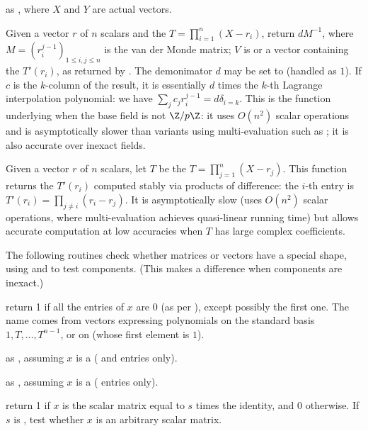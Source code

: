  as ,
where $X$ and $Y$ are actual  vectors.

 Given a vector $r$
of $n$ scalars and the  $T = \prod_{i=1}^n (X - r_i)$,
return $dM^{-1}$, where $M = (r_i^{j-1})_{1\leq i,j\leq n}$ is the van der
Monde matrix;  $V$ is  or a vector containing the $T'(r_i)$, as
returned by . The demonimator $d$ may be set to
 (handled as $1$). If $c$ is the $k$-column of the result, it is
essentially $d$ times  the $k$-th Lagrange interpolation polynomial: we have
$\sum_j c_j r_i^{j-1} = d \delta_{i=k}$. This is the function underlying
 when the base field is not $\Z/p\Z$: it uses $O(n^2)$
scalar operations and is asymptotically slower than variants using
multi-evaluation such as ; it is also accurate over inexact
fields.

 Given a vector $r$ of $n$ scalars, let
$T$ be the  $T = \prod_{j=1}^n (X - r_j)$. This function returns the
$T'(r_i)$ computed stably via products of difference: the $i$-th entry is
$T'(r_i) = \prod_{j\neq i} (r_i - r_j)$. It is asymptotically slow (uses
$O(n^2)$ scalar operations, where multi-evaluation achieves quasi-linear
running time) but allows accurate computation at low accuracies when $T$ has
large complex coefficients.


The following routines check whether matrices or vectors have a special
shape, using  and  to test components. (This makes
a difference when components are inexact.)

 return 1 if all the entries of $x$ are $0$
(as per ), except possibly the first one. The name comes from
vectors expressing polynomials on the standard basis $1,T,\dots, T^{n-1}$, or
on  (whose first element is $1$).

 as , assuming $x$ is a
 ( and  entries only).

 as , assuming $x$ is a
 ( entries only).

 return 1 if $x$ is the scalar matrix
equal to $s$ times the identity, and 0 otherwise. If $s$ is , test
whether $x$ is an arbitrary scalar matrix.


